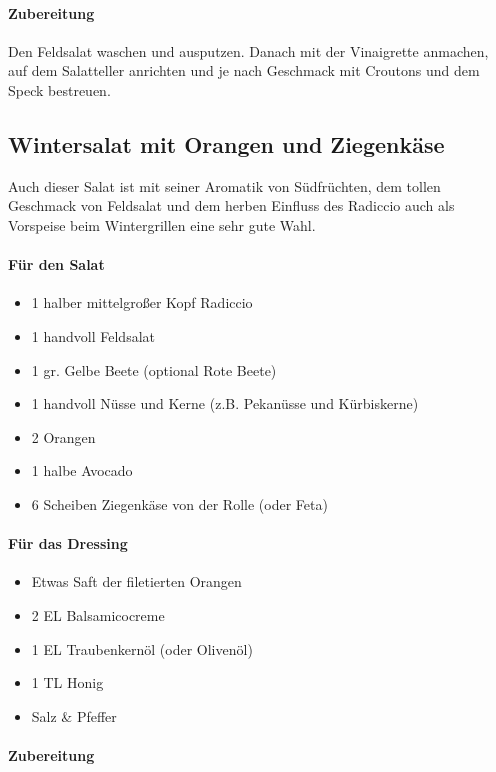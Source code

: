 \paragraph{Zubereitung}

Den Feldsalat waschen und ausputzen. Danach mit der Vinaigrette anmachen, auf dem Salatteller anrichten
und je nach Geschmack mit Croutons und dem Speck bestreuen.  

\subsection{Wintersalat mit Orangen und Ziegenkäse}
Auch dieser Salat ist mit seiner Aromatik von Südfrüchten, dem tollen Geschmack von Feldsalat und dem herben Einfluss des Radiccio
auch als Vorspeise beim Wintergrillen eine sehr gute Wahl.

\paragraph{Für den Salat}

\begin{itemize}[noitemsep]
	\item 1 halber mittelgroßer Kopf Radiccio
	\item 1 handvoll Feldsalat
	\item 1 gr. Gelbe Beete (optional Rote Beete)
	\item 1 handvoll Nüsse und Kerne (z.B. Pekanüsse und Kürbiskerne)
	\item 2 Orangen
	\item 1 halbe Avocado
	\item 6 Scheiben Ziegenkäse von der Rolle (oder Feta)
\end{itemize}	

\paragraph{Für das Dressing}

\begin{itemize}[noitemsep]
	\item Etwas Saft der filetierten Orangen
	\item 2 EL Balsamicocreme
	\item 1 EL Traubenkernöl (oder Olivenöl)
	\item 1 TL Honig
	\item  Salz \& Pfeffer
\end{itemize}

\paragraph{Zubereitung}

